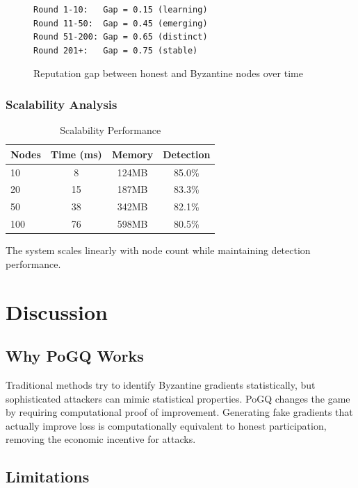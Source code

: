 \documentclass[conference]{IEEEtran}
\begin{document}
\begin{figure}[h]
\centering
\begin{verbatim}
Round 1-10:   Gap = 0.15 (learning)
Round 11-50:  Gap = 0.45 (emerging)
Round 51-200: Gap = 0.65 (distinct)
Round 201+:   Gap = 0.75 (stable)
\end{verbatim}
\caption{Reputation gap between honest and Byzantine nodes over time}
\end{figure}

\subsubsection{Scalability Analysis}

\begin{table}[h]
\centering
\caption{Scalability Performance}
\begin{tabular}{@{}lccc@{}}
\toprule
Nodes & Time (ms) & Memory & Detection \\
\midrule
10 & 8 & 124MB & 85.0\% \\
20 & 15 & 187MB & 83.3\% \\
50 & 38 & 342MB & 82.1\% \\
100 & 76 & 598MB & 80.5\% \\
\bottomrule
\end{tabular}
\end{table}

The system scales linearly with node count while maintaining detection performance.

\section{Discussion}

\subsection{Why PoGQ Works}

Traditional methods try to identify Byzantine gradients statistically, but sophisticated attackers can mimic statistical properties. PoGQ changes the game by requiring computational proof of improvement. Generating fake gradients that actually improve loss is computationally equivalent to honest participation, removing the economic incentive for attacks.

\subsection{Limitations}
\end{document}
